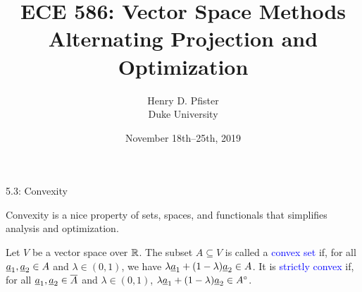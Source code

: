 \documentclass[10pt,letterpaper,english]{beamer}
\newif\ifslow
\begin{document}
\ifslow

\title{ECE 586: Vector Space Methods \\ Alternating Projection and Optimization}
\author{Henry D. Pfister \\ Duke University}
\date{November 18th--25th, 2019}
\maketitle


\begin{frame}{5.3: Convexity}

\vspace{-1mm}

\begin{minipage}{0.75\textwidth}
Convexity is a nice property of sets, spaces, and functionals that simplifies analysis and optimization.

\begin{definition}
Let $V$ be a vector space over $\mathbb{R}$.
The subset $A \subseteq V$ is called a \textcolor{blue}{convex set} if, for all $\underline{a}_1,\underline{a}_2 \in A$ and $\lambda\in(0,1)$, we have $\lambda \underline{a}_1 + (1-\lambda) \underline{a}_2 \in A$.
It is \textcolor{blue}{strictly convex} if, for all $\underline{a}_1,\underline{a}_2 \in \overline{A}$ and $\lambda\in(0,1)$,
$\lambda \underline{a}_1 + (1-\lambda) \underline{a}_2 \in {A}^{\circ}$.
\end{definition}
\end{minipage}
\hfill
\begin{minipage}{0.22\textwidth}
\end{minipage}


\end{frame}
\end{document}
